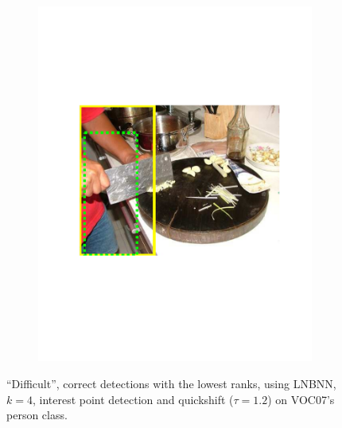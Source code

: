 \begin{figure}[hbt]
\begin{subfigure}[b]{0.45\textwidth}
        \includegraphics[width=\textwidth]{TP30705}
        \caption{}
        \label{fig:dettn4}
    \end{subfigure}
    \caption{``Difficult'', correct detections with the lowest ranks, using LNBNN, $k=4$, interest point detection and quickshift ($\tau=1.2$) on VOC07's person class.}
    \label{fig:dettn}
\end{figure}

